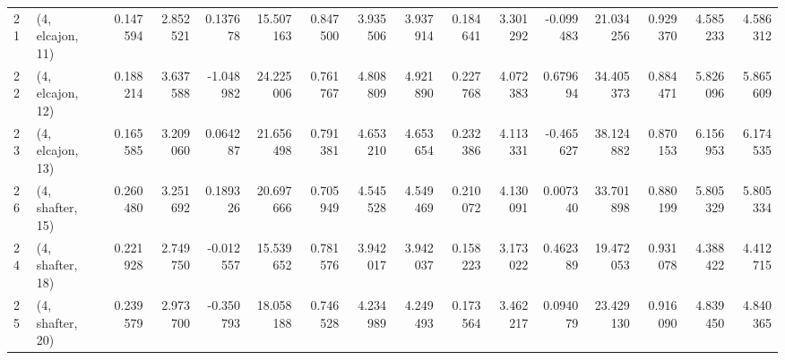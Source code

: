 \begin{tabular}{llrrrrrrrrrrrrrr}
21 &  (4, elcajon, 11) &   0.147594 &  2.852521 &  0.137678 &  15.507163 &  0.847500 &   3.935506 &  3.937914 &  0.184641 &   3.301292 & -0.099483 &   21.034256 &  0.929370 &   4.585233 &   4.586312 \\
22 &  (4, elcajon, 12) &   0.188214 &  3.637588 & -1.048982 &  24.225006 &  0.761767 &   4.808809 &  4.921890 &  0.227768 &   4.072383 &  0.679694 &   34.405373 &  0.884471 &   5.826096 &   5.865609 \\
23 &  (4, elcajon, 13) &   0.165585 &  3.209060 &  0.064287 &  21.656498 &  0.791381 &   4.653210 &  4.653654 &  0.232386 &   4.113331 & -0.465627 &   38.124882 &  0.870153 &   6.156953 &   6.174535 \\
26 &  (4, shafter, 15) &   0.260480 &  3.251692 &  0.189326 &  20.697666 &  0.705949 &   4.545528 &  4.549469 &  0.210072 &   4.130091 &  0.007340 &   33.701898 &  0.880199 &   5.805329 &   5.805334 \\
24 &  (4, shafter, 18) &   0.221928 &  2.749750 & -0.012557 &  15.539652 &  0.781576 &   3.942017 &  3.942037 &  0.158223 &   3.173022 &  0.462389 &   19.472053 &  0.931078 &   4.388422 &   4.412715 \\
25 &  (4, shafter, 20) &   0.239579 &  2.973700 & -0.350793 &  18.058188 &  0.746528 &   4.234989 &  4.249493 &  0.173564 &   3.462217 &  0.094079 &   23.429130 &  0.916090 &   4.839450 &   4.840365 \\
\bottomrule
\end{tabular}
